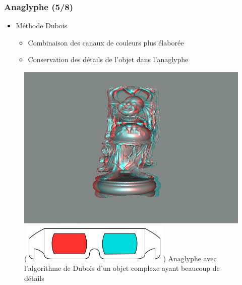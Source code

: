 \documentclass{beamer}
\begin{document}
%
\begin{frame}
\frametitle{Anaglyphe (5/8)}
\begin{itemize}[label=$\bullet$]
\item Méthode Dubois \cite{algoDubois}
	\begin{itemize}[label=$\circ$]
	\item Combinaison des canaux de couleurs plus élaborée
	\item Conservation des détails de l'objet dans l'anaglyphe 
	\end{itemize}
\end{itemize}
\begin{figure}
\centering
\includegraphics[scale=0.3]{happy_dubois.png}
\caption{(\includegraphics[scale=0.1]{lunettes.png})
Anaglyphe avec l'algorithme de Dubois d'un objet complexe ayant beaucoup de détails}
\end{figure}

\end{frame}
\end{document}
